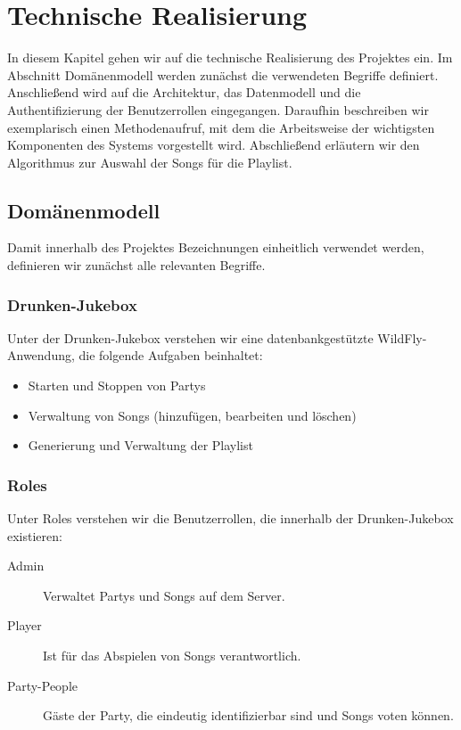 \newpage
\section{Technische Realisierung}
In diesem Kapitel gehen wir auf die technische Realisierung des Projektes ein. Im Abschnitt Domänenmodell werden zunächst die verwendeten Begriffe definiert. Anschließend wird auf die Architektur, das Datenmodell und die Authentifizierung der Benutzerrollen eingegangen. Daraufhin beschreiben wir exemplarisch einen Methodenaufruf, mit dem die Arbeitsweise der wichtigsten Komponenten des Systems vorgestellt wird. Abschließend erläutern wir den Algorithmus zur Auswahl der Songs für die Playlist.

\subsection{Domänenmodell}
\label{sec:Domaenenmodell}
Damit innerhalb des Projektes Bezeichnungen einheitlich verwendet werden, definieren wir zunächst alle relevanten Begriffe.

\subsubsection{Drunken-Jukebox}
Unter der Drunken-Jukebox verstehen wir eine datenbankgestützte WildFly-Anwendung, die folgende Aufgaben beinhaltet:

\begin{itemize}
	\item Starten und Stoppen von Partys
	\item Verwaltung von Songs (hinzufügen, bearbeiten und löschen)
	\item Generierung und Verwaltung der Playlist
\end{itemize}

\subsubsection{Roles}
Unter Roles verstehen wir die Benutzerrollen, die innerhalb der Drunken-Jukebox existieren:

\begin{description}
	\item [Admin] Verwaltet Partys und Songs auf dem Server.
	\item [Player] Ist für das Abspielen von Songs verantwortlich.
	\item [Party-People\footnotemark] Gäste der Party, die eindeutig identifizierbar sind und Songs voten können.
\end{description}

